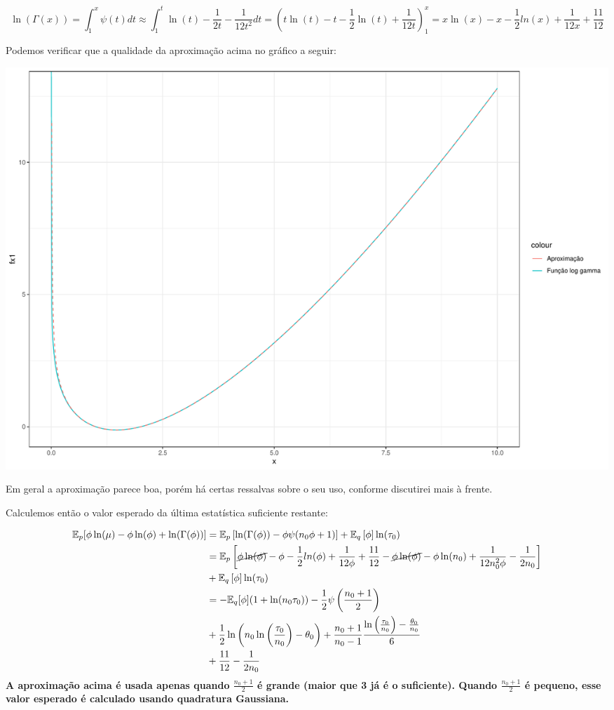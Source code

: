 \documentclass[
]{article}
\begin{document}
\[
\ln(\Gamma(x))= \int^{x}_{1}\psi(t)dt \approx \int^{t}_{1}\ln(t)-\frac{1}{2t}-\frac{1}{12t^2}dt  =\left(t\ln(t)-t-\frac{1}{2}\ln(t)+\frac{1}{12t}\right)^{x}_{1}=x\ln(x)-x-\frac{1}{2}ln(x)+\frac{1}{12x}+\frac{11}{12}
\]

Podemos verificar que a qualidade da aproximação acima no gráfico a
seguir:

\includegraphics{caso_gamma_revisto_revisto_files/figure-latex/unnamed-chunk-1-1.pdf}

Em geral a aproximação parece boa, porém há certas ressalvas sobre o seu
uso, conforme discutirei mais à frente.

Calculemos então o valor esperado da última estatística suficiente
restante:

\[
\begin{aligned}
\mathbb{E}_{p}[\phi\ln(\mu)-\phi\ln(\phi)+\ln(\Gamma(\phi))]&=\mathbb{E}_{p}\left[\ln(\Gamma(\phi))-\phi\psi(n_0 \phi +1 )\right]+\mathbb{E}_q\left[\phi\right]\ln(\tau_0)\\
&=\mathbb{E}_{p}\left[\cancel{\phi\ln(\phi)}-\phi-\frac{1}{2}ln(\phi)+\frac{1}{12\phi}+\frac{11}{12}-\cancel{\phi\ln(\phi)}-\phi\ln(n_0)+\frac{1}{12n^{2}_0\phi}-\frac{1}{2n_0}\right]\\
&+\mathbb{E}_q\left[\phi\right]\ln(\tau_0)\\
&=-\mathbb{E}_q[\phi](1+\ln(n_0\tau_0))-\frac{1}{2}\psi\left(\frac{n_0+1}{2}\right)\\
&+\frac{1}{2}\ln\left(n_0\ln\left(\frac{\tau_0}{n_0}\right)-\theta_0\right)+\frac{n_0+1}{n_0-1}\frac{\ln\left(\frac{\tau_0}{n_0}\right)-\frac{\theta_0}{n_0}}{6}\\
&+\frac{11}{12}-\frac{1}{2n_0}
\end{aligned}
\] \textbf{A aproximação acima é usada apenas quando \(\frac{n_0+1}{2}\)
é grande (maior que 3 já é o suficiente). Quando \(\frac{n_0+1}{2}\) é
pequeno, esse valor esperado é calculado usando quadratura Gaussiana.}
\end{document}
